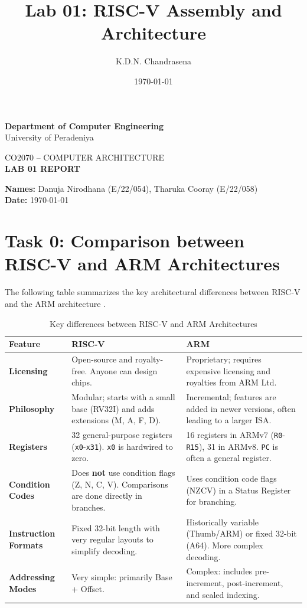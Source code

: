 \documentclass[12pt,a4paper]{article}
\title{Lab 01: RISC-V Assembly and Architecture}
\author{K.D.N. Chandrasena}
\date{\today}
\begin{document}
\begin{center}
{\Large \textbf{Department of Computer Engineering}}\\
\vspace{0.2cm}
{\large University of Peradeniya}\\
\vspace{0.6cm}

{\large CO2070 -- COMPUTER ARCHITECTURE}\\
\vspace{0.3cm}
{\Large \textbf{LAB 01 REPORT}}\\
\vspace{0.2cm}
\end{center}

{\large
\textbf{Names:} Danuja Nirodhana (E/22/054), Tharuka Cooray (E/22/058)\\[0.3cm]
\textbf{Date:} \today
}

\vspace{1cm}

\section*{Task 0: Comparison between RISC-V and ARM Architectures}

The following table summarizes the key architectural differences between RISC-V and the ARM architecture .

\begin{table}[H]
    \centering
    \renewcommand{\arraystretch}{1.5}
    \begin{tabular}{|p{3cm}|p{6cm}|p{6cm}|}
        \hline
        \textbf{Feature} & \textbf{RISC-V} & \textbf{ARM} \\ \hline
        \textbf{Licensing} & Open-source and royalty-free. Anyone can design chips. & Proprietary; requires expensive licensing and royalties from ARM Ltd. \\ \hline
        \textbf{Philosophy} & Modular; starts with a small base (RV32I) and adds extensions (M, A, F, D). & Incremental; features are added in newer versions, often leading to a larger ISA. \\ \hline
        \textbf{Registers} & 32 general-purpose registers (\texttt{x0}-\texttt{x31}). \texttt{x0} is hardwired to zero. & 16 registers in ARMv7 (\texttt{R0}-\texttt{R15}), 31 in ARMv8. \texttt{PC} is often a general register. \\ \hline
        \textbf{Condition Codes} & Does \textbf{not} use condition flags (Z, N, C, V). Comparisons are done directly in branches. & Uses condition code flags (NZCV) in a Status Register for branching. \\ \hline
        \textbf{Instruction Formats} & Fixed 32-bit length with very regular layouts to simplify decoding. & Historically variable (Thumb/ARM) or fixed 32-bit (A64). More complex decoding. \\ \hline
        \textbf{Addressing Modes} & Very simple: primarily Base + Offset. & Complex: includes pre-increment, post-increment, and scaled indexing. \\ \hline
    \end{tabular}
    \caption{Key differences between RISC-V and ARM Architectures}
\end{table}
\end{document}

